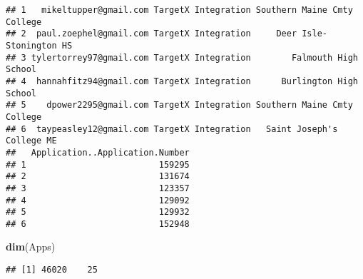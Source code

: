\documentclass[]{article}
\newenvironment{Shaded}{\begin{snugshade}}{\end{snugshade}}
\newcommand{\KeywordTok}[1]{\textcolor[rgb]{0.13,0.29,0.53}{\textbf{#1}}}
\newcommand{\NormalTok}[1]{#1}
\begin{document}
\begin{verbatim}
## 1   mikeltupper@gmail.com TargetX Integration Southern Maine Cmty College
## 2  paul.zoephel@gmail.com TargetX Integration     Deer Isle-Stonington HS
## 3 tylertorrey97@gmail.com TargetX Integration        Falmouth High School
## 4  hannahfitz94@gmail.com TargetX Integration      Burlington High School
## 5    dpower2295@gmail.com TargetX Integration Southern Maine Cmty College
## 6  taypeasley12@gmail.com TargetX Integration   Saint Joseph's College ME
##   Application..Application.Number
## 1                          159295
## 2                          131674
## 3                          123357
## 4                          129092
## 5                          129932
## 6                          152948
\end{verbatim}

\begin{Shaded}
\begin{Highlighting}[]
\KeywordTok{dim}\NormalTok{(Apps)}
\end{Highlighting}
\end{Shaded}

\begin{verbatim}
## [1] 46020    25
\end{verbatim}
\end{document}
